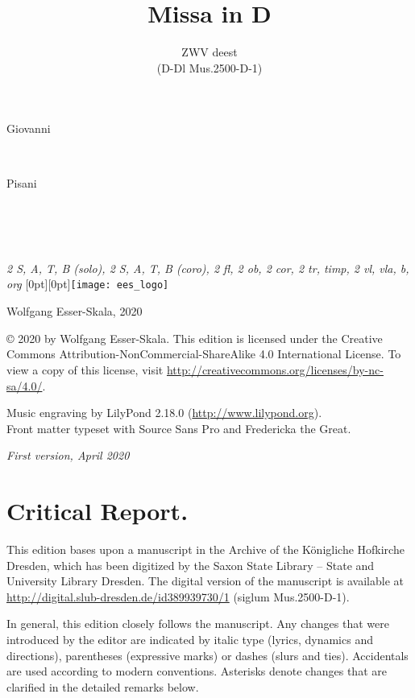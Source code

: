 \documentclass[parskip=full]{scrreprt}
\makeatletter
\DeclareRobustCommand{\sbseries}{\fontseries{sb}\selectfont}
\newcommand\fancytitlehead{
	\headingfont%
	\fontsize{80}{80}\selectfont\textcolor{black!80}{\@lastname.}\\[15pt]%
	\fontsize{60}{60}\selectfont\@title.%
}
\def\firstname#1{\def\@firstname{#1}}
\def\lastname#1{\def\@lastname{#1}}
\def\instrumentation#1{\def\@instrumentation{#1}}
\def\maketitle{%
\begin{titlepage}%
	\Large%
	{\@titlehead}%
	\vfill%
	{\strut\@firstname}\\%
	{\sbseries\color{oldred}\strut\@lastname}\\%
	{\strut\@namesuffix}%
	\vfill%
	{\sbseries\@title}\\%
	{\@subtitle}\\[\baselineskip]%
	{\itshape\@instrumentation}%
	\vfill%
	{\itshape\@parts}\hspace*{\fill}\raisebox{0pt}[0pt][0pt]{\texttt{[image: ees\_logo]}}%
\end{titlepage}%
}
\newif\ifprintreport\printreportfalse
\makeatother
\begin{document}
\titlehead{\fancytitlehead}
\firstname{Giovanni} %
\lastname{Pisani}
\title{Missa in D}
\subtitle{ZWV deest\\(D-Dl Mus.2500-D-1)}
\instrumentation{2 S, A, T, B (solo), 2 S, A, T, B (coro), 2 fl, 2 ob, 2 cor, 2 tr, timp, 2 vl, vla, b, org}
\maketitle


\thispagestyle{empty}

\vspace*{\fill}

\hspace*{1em}Wolfgang Esser-Skala, 2020

© 2020 by Wolfgang Esser-Skala. This edition is licensed under the Creative Commons Attribution-NonCommercial-ShareAlike 4.0 International License. To view a copy of this license, visit \url{http://creativecommons.org/licenses/by-nc-sa/4.0/}. 

Music engraving by LilyPond 2.18.0 (\url{http://www.lilypond.org}).\\
Front matter typeset with Source Sans Pro and Fredericka the Great.

\textit{First version, April 2020}

\vspace*{2cm}

\ifprintreport
\chapter*{Critical Report.}

This edition bases upon a manuscript in the Archive of the Königliche Hofkirche Dresden, which has been digitized by the Saxon State Library – State and University Library Dresden. The digital version of the manuscript is available at \url{http://digital.slub-dresden.de/id389939730/1} (siglum Mus.2500-D-1).

In general, this edition closely follows the manuscript. Any changes that were introduced by the editor are indicated by italic type (lyrics, dynamics and directions), parentheses (expressive marks) or dashes (slurs and ties). Accidentals are used according to modern conventions. Asterisks denote changes that are clarified in the detailed remarks below.

\bigskip

\end{document}
